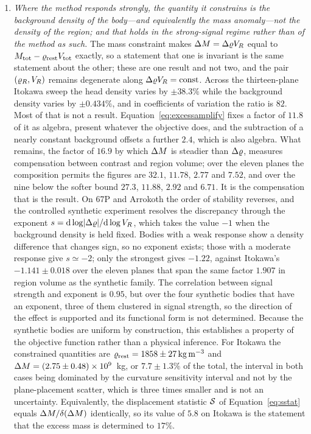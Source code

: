 \begin{enumerate}
\item \emph{Where the method responds strongly, the quantity it
constrains is the background density of the body---and equivalently the
mass anomaly---not the density of the region; and that holds in the
strong-signal regime rather than of the method as such.} The mass
constraint makes $\Delta M = \Delta\varrho V_{R}$ equal to $M_{\mathrm{tot}}-\varrho_{\mathrm{rest}}V_{\mathrm{tot}}$
exactly, so a statement that one is invariant is the same statement about
the other; these are one result and not two, and the pair
$(\varrho_{R},V_{R})$ remains degenerate along $\Delta\varrho V_{R} = \mathrm{const}$.
Across the thirteen-plane Itokawa sweep the head density varies by
$\pm38.3\%$ while the background density varies by $\pm0.434\%$, and in
coefficients of variation the ratio is $82$. Most of that is not a
result. Equation~\eqref{eq:excessamplify} fixes a factor of $11.8$ of it as
algebra, present whatever the objective does, and the subtraction of a
nearly constant background offsets a further $2.4$, which is also algebra.
What remains, the factor of $16.9$ by which $\Delta M$ is steadier than
$\Delta\varrho$, measures compensation between contrast and region volume; over
the eleven planes the composition permits the figures are $32.1$, $11.78$,
$2.77$ and $7.52$, and over the nine below the softer bound $27.3$, $11.88$,
$2.92$ and $6.71$. It is the compensation that is the result. On 67P and
Arrokoth the
order of stability reverses, and the controlled synthetic experiment
resolves the discrepancy through the exponent
$s = \mathrm{d}\log\lvert\Delta\varrho\rvert/\mathrm{d}\log V_{R}$, which takes the
value $-1$ when the background density is held fixed. Bodies with a weak
response show a density difference that changes sign, so no exponent
exists; those with a moderate response give $s \simeq -2$; only the
strongest gives $-1.22$, against Itokawa's $-1.141 \pm 0.018$ over the
eleven planes that span the same factor $1.907$ in region volume as the
synthetic family. The correlation between signal strength and exponent is
$0.95$, but over the four synthetic bodies that have an exponent, three of
them clustered in signal strength, so the direction of the effect is
supported and its functional form is not determined. Because the
synthetic bodies are uniform by construction, this establishes a property
of the objective function rather than a physical inference. For Itokawa
the constrained quantities are
$\varrho_{\mathrm{rest}} = 1858 \pm \SI{27}{\kilo\gram\per\cubic\metre}$ and
$\Delta M = (2.75 \pm 0.48)\times10^{9}$~kg, or $7.7 \pm 1.3\%$ of the
total, the interval in both cases being dominated by the curvature
sensitivity interval and not by the plane-placement scatter, which is
three times smaller and is not an uncertainty. Equivalently, the
displacement statistic $\mathcal{S}$ of Equation~\eqref{eq:sstat} equals
$\Delta M/\delta(\Delta M)$ identically, so its value of $5.8$ on Itokawa is
the statement that the excess mass is determined to $17\%$.


\end{enumerate}
